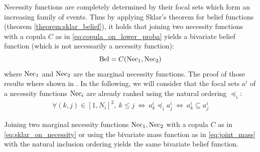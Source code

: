 Necessity functions are completely determined by their focal sets which form an increasing family of events. Thus by applying Sklar's theorem for belief functions (theorem \ref{theorem:sklar_belief}), it holds that joining two necessity functions with a copula $C$ as in \eqref{eq:copula_on_lower_proba} yields a bivariate belief function (which is not necessarily a necessity function):
\begin{equation}
    {\mathrm{Bel}} = C({\mathrm{Nec}}_1, {\mathrm{Nec}}_2)\label{eq:sklar_on_necessity}
\end{equation}
where ${\mathrm{Nec}}_1$ and ${\mathrm{Nec}}_2$ are the marginal necessity functions. The proof of those results where shown in \cite{schmelzer_joint_2015,schmelzer_sklars_2015}. In the following, we will consider that the focal sets $a^i$ of a necessity functions ${\mathrm{Nec}}_i$ are already ranked using the natural ordering $\preceq_i$:
\begin{eqnarray}
    \forall (k,j)\in[1, N_i]^2,~k\leqslant j ~\Leftrightarrow ~ a^i_k \preceq_i a^i_j ~\Leftrightarrow ~ a^i_k\subseteq a^i_j
\end{eqnarray}

\begin{proposition}\label{prop:sklar_necessity}
    Joining two marginal necessity functions ${\mathrm{Nec}}_1, {\mathrm{Nec}}_2$ with a copula $C$ as in \eqref{eq:sklar_on_necessity} or using the bivariate mass function as in \eqref{eq:joint_mass} with the natural inclusion ordering yields the same bivariate belief function.
\end{proposition}

